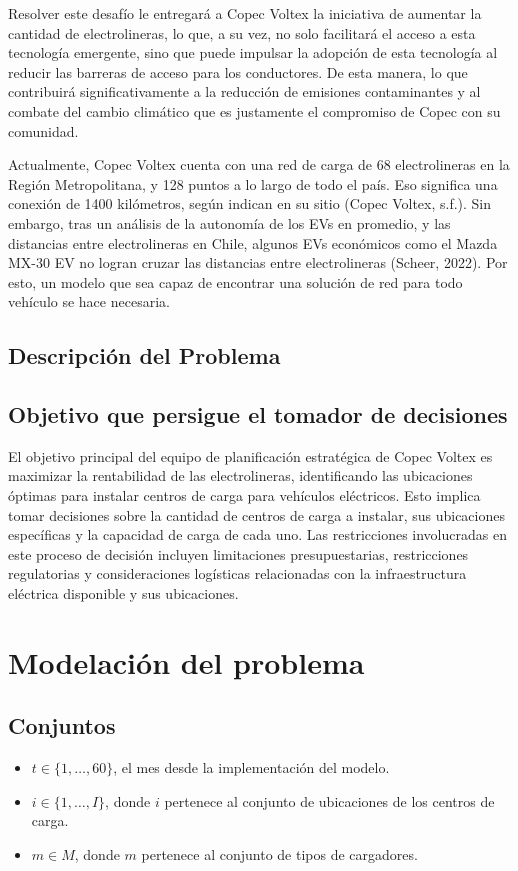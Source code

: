 \documentclass[letterpaper]{article}
\begin{document}
\begin{flushleft}
		Resolver este desafío le entregará a Copec Voltex la iniciativa de aumentar la cantidad de electrolineras, lo que, a su vez, no solo facilitará el acceso a esta tecnología emergente, sino que puede impulsar la adopción de esta tecnología al reducir las barreras de acceso para los conductores. De esta manera, lo que contribuirá significativamente a la reducción de emisiones contaminantes y al combate del cambio climático que es justamente el compromiso de Copec con su comunidad. 

		Actualmente, Copec Voltex cuenta con una red de carga de 68 electrolineras en la Región Metropolitana, y 128 puntos a lo largo de todo el país. Eso significa una conexión de 1400 kilómetros, según indican en su sitio (Copec Voltex, s.f.). Sin embargo, tras un análisis de la autonomía de los EVs en promedio, y las distancias entre electrolineras en Chile, algunos EVs económicos como el Mazda MX-30 EV no logran cruzar las distancias entre electrolineras (Scheer, 2022). Por esto, un modelo que sea capaz de encontrar una solución de red para todo vehículo se hace necesaria. 
 
		\subsection{Descripción del Problema}
		\subsection{Objetivo que persigue el tomador de decisiones}
		El objetivo principal del equipo de planificación estratégica de Copec Voltex es maximizar la rentabilidad de las electrolineras, identificando las ubicaciones óptimas para instalar centros de carga para vehículos eléctricos. Esto implica tomar decisiones sobre la cantidad de centros de carga a instalar, sus ubicaciones específicas y la capacidad de carga de cada uno. Las restricciones involucradas en este proceso de decisión incluyen limitaciones presupuestarias, restricciones regulatorias y consideraciones logísticas relacionadas con la infraestructura eléctrica disponible y sus ubicaciones. 		
		\section{Modelación del problema}
		\subsection{Conjuntos}
		\begin{itemize}
			\item $t \in \{1, \ldots, 60\}$, el mes desde la implementación del modelo.
			\item $i \in \{1, \ldots, I\}$, donde $i$ pertenece al conjunto de ubicaciones de los centros de carga.
			\item $m \in M$, donde $m$ pertenece al conjunto de tipos de cargadores.
		\end{itemize}
		

\end{flushleft}
\end{document}
